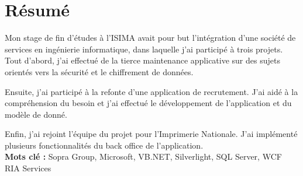 \cleardoublepage

\chapter*{Résumé}

\thispagestyle{empty}



Mon stage de fin d'études à l'ISIMA avait pour but l'intégration d'une société de services en ingénierie informatique, dans laquelle j'ai participé à trois projets.
\\

Tout d'abord, j'ai effectué de la tierce maintenance applicative sur des sujets orientés vers la sécurité et le chiffrement de données.

Ensuite, j'ai participé à la refonte d'une application de recrutement.
J'ai aidé à la compréhension du besoin et j'ai effectué le développement de l'application et du modèle de donné.

Enfin, j'ai rejoint l'équipe du projet pour l'Imprimerie Nationale.
J'ai implémenté plusieurs fonctionnalités du back office de l'application.
\\

\textbf{Mots clé : } Sopra Group, Microsoft, VB.NET, Silverlight, SQL Server, WCF RIA Services